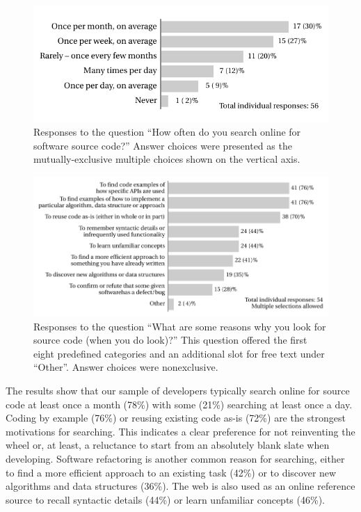 \documentclass{casicswhitepaper}
\begin{document}
\begin{figure}[bht]
  \centering
  \includegraphics[scale=0.9]{files/plots/bar-graph-how-often-src.pdf}
  \vspace*{-3ex}
  \caption{Responses to the question  ``How often do you search online for software source code?''  Answer choices were presented as the mutually-exclusive multiple choices shown on the vertical axis.}
  \label{how-often-search-for-src}
\end{figure}

\begin{figure}[b]
  \centering
  \includegraphics[width=5.6in]{files/plots/bar-graph-why-search-for-src.pdf}
  \vspace*{-2ex}
  \caption{Responses to the question ``What are some reasons why you look for source code (when you do look)?''  This question offered the first eight predefined categories and an additional slot for free text under ``Other''.  Answer choices were nonexclusive.}
  \label{why-search-for-src}
\end{figure}

The results show that our sample of developers typically search online for source code at least once a month (78\%) with some (21\%) searching at least once a day. Coding by example (76\%) or reusing existing code as-is (72\%) are the strongest motivations for searching. This indicates a clear preference for not reinventing the wheel or, at least, a reluctance to start from an absolutely blank slate when developing. Software refactoring is another common reason for searching, either to find a more efficient approach to an existing task (42\%) or to discover new algorithms and data structures (36\%). The web is also used as an online reference source to recall syntactic details (44\%) or learn unfamiliar concepts (46\%). %
\end{document}
